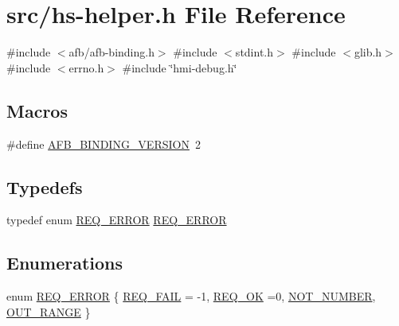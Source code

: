\hypertarget{hs-helper_8h}{}\section{src/hs-\/helper.h File Reference}
\label{hs-helper_8h}
{\ttfamily \#include $<$afb/afb-\/binding.\+h$>$}\newline
{\ttfamily \#include $<$stdint.\+h$>$}\newline
{\ttfamily \#include $<$glib.\+h$>$}\newline
{\ttfamily \#include $<$errno.\+h$>$}\newline
{\ttfamily \#include \char`\"{}hmi-\/debug.\+h\char`\"{}}\newline
\subsection*{Macros}
\begin{DoxyCompactItemize}
\item 
\#define \hyperlink{hs-helper_8h_ad2c1fbc92ba364fcf83f15e6d0af66f0}{A\+F\+B\+\_\+\+B\+I\+N\+D\+I\+N\+G\+\_\+\+V\+E\+R\+S\+I\+ON}~2
\end{DoxyCompactItemize}
\subsection*{Typedefs}
\begin{DoxyCompactItemize}
\item 
typedef enum \hyperlink{hs-helper_8h_aa49f1dbbf26f01627a5737cf43aad899}{R\+E\+Q\+\_\+\+E\+R\+R\+OR} \hyperlink{hs-helper_8h_ab0d62ccfa9c3ab87f090f67c3d50adce}{R\+E\+Q\+\_\+\+E\+R\+R\+OR}
\end{DoxyCompactItemize}
\subsection*{Enumerations}
\begin{DoxyCompactItemize}
\item 
enum \hyperlink{hs-helper_8h_aa49f1dbbf26f01627a5737cf43aad899}{R\+E\+Q\+\_\+\+E\+R\+R\+OR} \{ \hyperlink{hs-helper_8h_aa49f1dbbf26f01627a5737cf43aad899a96a855966bc63045222b3dcac524cee1}{R\+E\+Q\+\_\+\+F\+A\+IL} = -\/1, 
\hyperlink{hs-helper_8h_aa49f1dbbf26f01627a5737cf43aad899ab093abb14c097b3b7719debb04d5e8ee}{R\+E\+Q\+\_\+\+OK} =0, 
\hyperlink{hs-helper_8h_aa49f1dbbf26f01627a5737cf43aad899aa223eed65c9bee2bf1f4cdecaf90d66a}{N\+O\+T\+\_\+\+N\+U\+M\+B\+ER}, 
\hyperlink{hs-helper_8h_aa49f1dbbf26f01627a5737cf43aad899add1c84bf80c5f80741ee8f37fef1e12b}{O\+U\+T\+\_\+\+R\+A\+N\+GE}
 \}
\end{DoxyCompactItemize}

